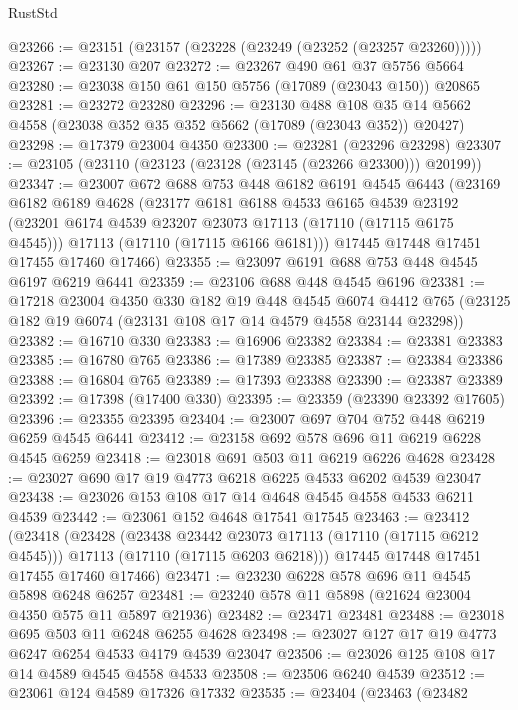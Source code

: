 \begin{lexlean}{RustStd}
\begin{coremodule}
@23266 := @23151 (@23157 (@23228 (@23249 (@23252 (@23257 @23260)))))
@23267 := @23130 @207
@23272 := @23267 @490 @61 @37 @5756 @5664
@23280 := @23038 @150 @61 @150 @5756 (@17089 (@23043 @150)) @20865
@23281 := @23272 @23280
@23296 := @23130
    @488
    @108
    @35
    @14
    @5662
    @4558
    (@23038 @352 @35 @352 @5662 (@17089 (@23043 @352)) @20427)
@23298 := @17379 @23004 @4350
@23300 := @23281 (@23296 @23298)
@23307 := @23105 (@23110 (@23123 (@23128 (@23145 (@23266 @23300))) @20199))
@23347 := @23007
    @672
    @688
    @753
    @448
    @6182
    @6191
    @4545
    @6443
    (@23169
      @6182
      @6189
      @4628
      (@23177
        @6181
        @6188
        @4533
        @6165
        @4539
        @23192
        (@23201 @6174 @4539 @23207 @23073 @17113 (@17110 (@17115 @6175 @4545)))
        @17113
        (@17110 (@17115 @6166 @6181)))
      @17445
      @17448
      @17451
      @17455
      @17460
      @17466)
@23355 := @23097 @6191 @688 @753 @448 @4545 @6197 @6219 @6441
@23359 := @23106 @688 @448 @4545 @6196
@23381 := @17218
    @23004
    @4350
    @330
    @182
    @19
    @448
    @4545
    @6074
    @4412
    @765
    (@23125 @182 @19 @6074 (@23131 @108 @17 @14 @4579 @4558 @23144 @23298))
@23382 := @16710 @330
@23383 := @16906 @23382
@23384 := @23381 @23383
@23385 := @16780 @765
@23386 := @17389 @23385
@23387 := @23384 @23386
@23388 := @16804 @765
@23389 := @17393 @23388
@23390 := @23387 @23389
@23392 := @17398 (@17400 @330)
@23395 := @23359 (@23390 @23392 @17605)
@23396 := @23355 @23395
@23404 := @23007 @697 @704 @752 @448 @6219 @6259 @4545 @6441
@23412 := @23158 @692 @578 @696 @11 @6219 @6228 @4545 @6259
@23418 := @23018 @691 @503 @11 @6219 @6226 @4628
@23428 := @23027 @690 @17 @19 @4773 @6218 @6225 @4533 @6202 @4539 @23047
@23438 := @23026 @153 @108 @17 @14 @4648 @4545 @4558 @4533 @6211 @4539
@23442 := @23061 @152 @4648 @17541 @17545
@23463 := @23412
    (@23418
      (@23428
        (@23438 @23442 @23073 @17113 (@17110 (@17115 @6212 @4545)))
        @17113
        (@17110 (@17115 @6203 @6218)))
      @17445
      @17448
      @17451
      @17455
      @17460
      @17466)
@23471 := @23230 @6228 @578 @696 @11 @4545 @5898 @6248 @6257
@23481 := @23240 @578 @11 @5898 (@21624 @23004 @4350 @575 @11 @5897 @21936)
@23482 := @23471 @23481
@23488 := @23018 @695 @503 @11 @6248 @6255 @4628
@23498 := @23027 @127 @17 @19 @4773 @6247 @6254 @4533 @4179 @4539 @23047
@23506 := @23026 @125 @108 @17 @14 @4589 @4545 @4558 @4533
@23508 := @23506 @6240 @4539
@23512 := @23061 @124 @4589 @17326 @17332
@23535 := @23404
    (@23463
      (@23482

\end{coremodule}
\end{lexlean}
